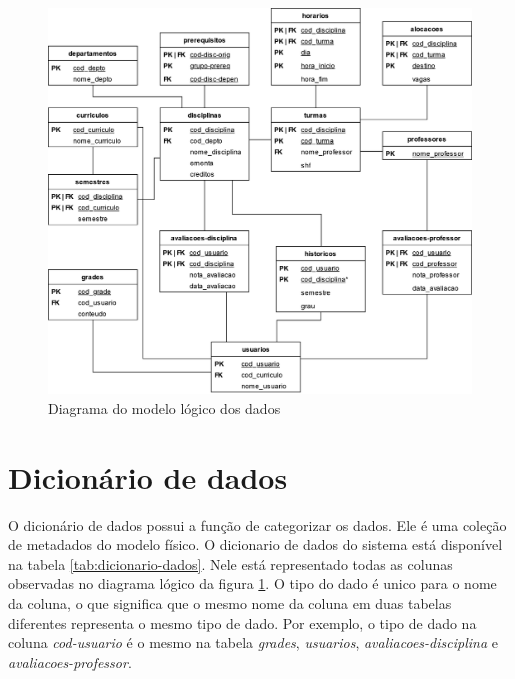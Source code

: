 \begin{figure}[ht]
    \begin{center}
    \includegraphics[width=390pt]{figuras/diagrama-logico.png}
    \caption{Diagrama do modelo lógico dos dados}
    \label{fig:modelo-logico}
    \end{center}
\end{figure}

\section{Dicionário de dados}

O dicionário de dados possui a função de categorizar os dados. 
Ele é uma coleção de metadados do modelo físico. 
O dicionario de dados do sistema está disponível na tabela \ref{tab:dicionario-dados}. 
Nele está representado todas as colunas observadas no diagrama lógico da figura \ref{fig:modelo-logico}.
O tipo do dado é unico para o nome da coluna, o que significa que o mesmo nome da coluna em duas tabelas diferentes representa o mesmo tipo de dado. 
Por exemplo, o tipo de dado na coluna \textit{cod-usuario} é o mesmo na tabela \textit{grades}, \textit{usuarios}, \textit{avaliacoes-disciplina} e \textit{avaliacoes-professor}.

